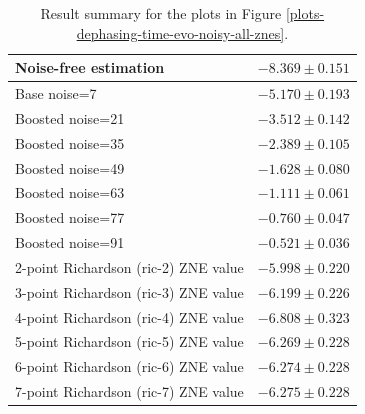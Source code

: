 \begin{table}
\caption{Result summary for the plots in Figure \ref{plots-dephasing-time-evo-noisy-all-znes}.}
\begin{tabular*}{\textwidth}{@{\extracolsep{\fill}}ll@{}}
\toprule

Noise-free estimation & $-8.369 \pm 0.151$ \\
\midrule
Base noise=7 & $-5.170 \pm 0.193$ \\
Boosted noise=21 & $-3.512 \pm 0.142$ \\
Boosted noise=35 & $-2.389 \pm 0.105$ \\
Boosted noise=49 & $-1.628 \pm 0.080$ \\
Boosted noise=63 & $-1.111 \pm 0.061$ \\
Boosted noise=77 & $-0.760 \pm 0.047$ \\
Boosted noise=91 & $-0.521 \pm 0.036$ \\
\midrule
2-point Richardson (ric-2) ZNE value & $-5.998 \pm 0.220$ \\
3-point Richardson (ric-3) ZNE value & $-6.199 \pm 0.226$ \\
4-point Richardson (ric-4) ZNE value & $-6.808 \pm 0.323$ \\
5-point Richardson (ric-5) ZNE value & $-6.269 \pm 0.228$ \\
6-point Richardson (ric-6) ZNE value & $-6.274 \pm 0.228$ \\
7-point Richardson (ric-7) ZNE value & $-6.275 \pm 0.228$ \\
\bottomrule
\end{tabular*}
\label{table-dephasing-noise-free-time-evo}
\end{table}
